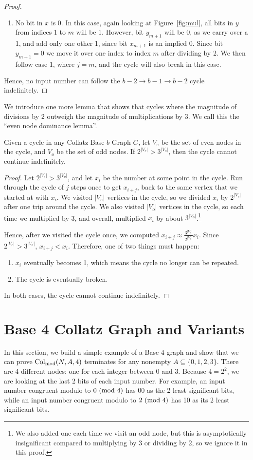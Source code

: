 \begin{proof}
\begin{enumerate}
    \item No bit in $x$ is 0. In this case, again looking at Figure~\ref{fig:mul}, all bits in $y$ from indices 1 to $m$ will be 1. However, bit $y_{m+1}$ will be 0, as we carry over a 1, and add only one other 1, since bit $x_{m+1}$ is an implied 0. Since bit $y_{m+1} = 0$ we move it over one index to index $m$ after dividing by 2. We then follow case 1, where $j = m$, and the cycle will also break in this case.
 \end{enumerate}
 Hence, no input number can follow the $b-2 \rightarrow b-1 \rightarrow b-2$ cycle indefinitely. 
\end{proof}
We introduce one more lemma that shows that cycles where the magnitude of divisions by 2 outweigh the magnitude of multiplications by 3. We call this the ``even node dominance lemma''.
\begin{lemma}
\label{lem:EvenDom}
Given a cycle in any Collatz Base $b$ Graph $G$, let $V_{e}$ be the set of even nodes in the cycle, and $V_{o}$ be the set of odd nodes. If $2^{|V_e|} > 3^{|V_o|}$, then the cycle cannot continue indefinitely.
\end{lemma}
\begin{proof}
Let $2^{|V_e|} > 3^{|V_o|}$, and let $x_i$ be the number at some point in the cycle. Run through the cycle of $j$ steps once to get $x_{i+j}$, back to the same vertex that we started at with $x_i$. We visited $|V_e|$ vertices in the cycle, so we divided $x_i$ by $2^{|V_e|}$ after one trip around the cycle. We also visited $|V_o|$ vertices in the cycle, so each time we multiplied by 3, and overall, multiplied $x_i$ by about $3^{|V_o|}$.\footnote{We also added one each time we visit an odd node, but this is asymptotically insignificant compared to multiplying by 3 or dividing by 2, so we ignore it in this proof.}\par
Hence, after we visited the cycle once, we computed $x_{i+j} \approx \frac{3^{|V_o|}}{2^{|V_e|}}x_i$. Since $2^{|V_e|} > 3^{|V_o|}$, $x_{i+j} < x_i$. Therefore, one of two things must happen:
\begin{enumerate}
\item $x_i$ eventually becomes 1, which means the cycle no longer can be repeated.
\item The cycle is eventually broken.
\end{enumerate}
In both cases, the cycle cannot continue indefinitely.
\end{proof}
\section{Base 4 Collatz Graph and Variants} \label{subsec:base4graph}
In this section, we build a simple example of a Base 4 graph and show that we can prove $\mathrm{Col}_{\text{mod}}(N,A,4)$ terminates for any nonempty $A \subseteq \{0,1,2,3\}$. There are 4 different nodes: one for each integer between 0 and 3. Because $4 = 2^2$, we are looking at the last 2 bits of each input number. For example, an input number congruent modulo to $0\ (\mathrm{mod}\ 4)$ has 00 as the 2 least significant bits, while an input number congruent modulo to $2\ (\mathrm{mod}\ 4)$ has 10 as its 2 least significant bits. 

